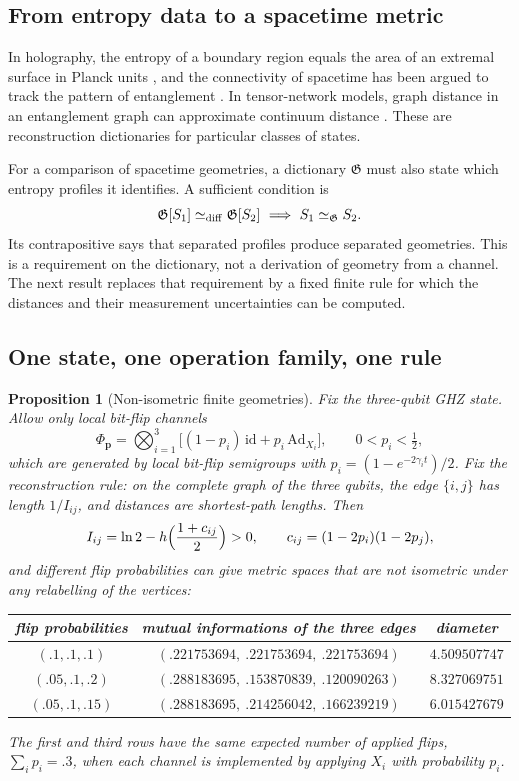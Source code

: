 \documentclass[12pt,a4paper]{article}
\newtheorem{proposition}[theorem]{Proposition}
\begin{document}
\subsection{From entropy data to a spacetime metric}

In holography, the entropy of a boundary region equals the area of an extremal surface in Planck units \cite{RyuTakayanagi2006}, and the connectivity of spacetime has been argued to track the pattern of entanglement \cite{VanRaamsdonk2010}. In tensor-network models, graph distance in an entanglement graph can approximate continuum distance \cite{Swingle2012}. These are reconstruction dictionaries for particular classes of states.

For a comparison of spacetime geometries, a dictionary $\mathfrak G$
must also state which entropy profiles it identifies. A sufficient
condition is
\[
\mathfrak G[S_1]\simeq_{\rm diff}\mathfrak G[S_2]
       \ \Longrightarrow\ S_1\simeq_{\mathfrak G}S_2 .
\]
Its contrapositive says that separated profiles produce separated
geometries. This is a requirement on the dictionary, not a derivation
of geometry from a channel. The next result replaces that requirement
by a fixed finite rule for which the distances and their measurement
uncertainties can be computed.

\subsection{One state, one operation family, one rule}

\begin{proposition}[Non-isometric finite geometries]
\label{prop:ghz}
Fix the three-qubit GHZ state. Allow only local bit-flip channels
\[
\Phi_{\mathbf p}=\bigotimes_{i=1}^3\bigl[(1-p_i)\,\mathrm{id}+p_i\,\mathrm{Ad}_{X_i}\bigr],\qquad 0<p_i<\tfrac12,
\]
which are generated by local bit-flip semigroups with $p_i=(1-e^{-2\gamma_it})/2$. Fix the reconstruction rule: on the complete graph of the three qubits, the edge $\{i,j\}$ has length $1/I_{ij}$, and distances are shortest-path lengths. Then
\[
I_{ij}=\ln2-h\Bigl(\frac{1+c_{ij}}2\Bigr)>0,\qquad c_{ij}=(1-2p_i)(1-2p_j),
\]
and different flip probabilities can give metric spaces that are not isometric under any relabelling of the vertices:
\begin{center}
\begin{tabular}{ccc}
\toprule
flip probabilities & mutual informations of the three edges & diameter\\
\midrule
$(.1,.1,.1)$ & $(.221753694,\ .221753694,\ .221753694)$ & $4.509507747$\\
$(.05,.1,.2)$ & $(.288183695,\ .153870839,\ .120090263)$ & $8.327069751$\\
$(.05,.1,.15)$ & $(.288183695,\ .214256042,\ .166239219)$ & $6.015427679$\\
\bottomrule
\end{tabular}
\end{center}
The first and third rows have the same expected number of applied flips, $\sum_ip_i=.3$, when each channel is implemented by applying $X_i$ with probability $p_i$.
\end{proposition}
\end{document}
